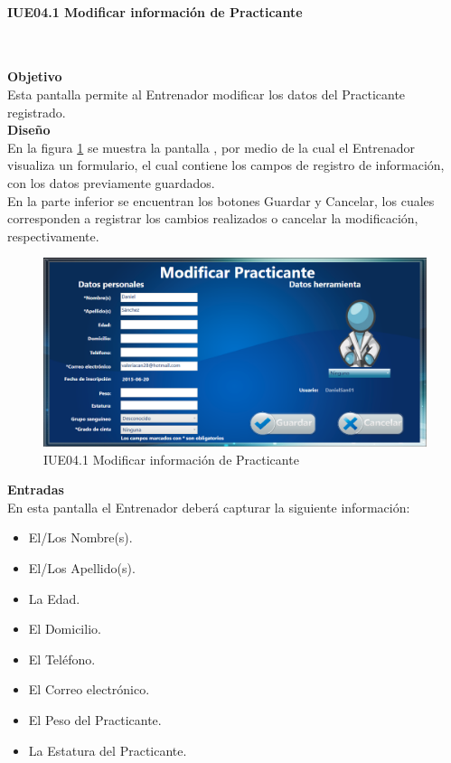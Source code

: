 \paragraph{IUE04.1 Modificar información de Practicante} \hspace{1cm}\\ 
\label{pant:IUE04.1} 

\textbf{\textcolor[rgb]{0, 0, 0.545098}{Objetivo}}\\
Esta pantalla permite al Entrenador modificar los datos del Practicante registrado.\\

\textbf{\textcolor[rgb]{0, 0, 0.545098}{Diseño}}\\
En la figura \ref{fig:IUE04.1} se muestra la pantalla , por medio de la cual el Entrenador visualiza un formulario, el cual contiene los campos de registro de información, con los datos previamente guardados.\\

En la parte inferior se encuentran los botones Guardar y Cancelar,  los cuales corresponden a registrar los cambios realizados o cancelar la modificación, respectivamente.

\begin{figure}[H]
	\centering
		\includegraphics[scale=0.5]{./Figuras/Pantallas/IUE04_1Modificar_informacion_de_Practicante}
	\caption{IUE04.1 Modificar información de Practicante}
	\label{fig:IUE04.1}
\end{figure}

\textbf{\textcolor[rgb]{0, 0, 0.545098}{Entradas}}\\
En esta pantalla el Entrenador deberá capturar la siguiente información:

\begin{itemize}
	\item El/Los Nombre(s).
	\item El/Los Apellido(s).
	\item La Edad.
	\item El Domicilio.
	\item El Teléfono.
	\item El Correo electrónico.
	\item El Peso del Practicante.
	\item La Estatura del Practicante.
\end{itemize}
\vspace{1em}

